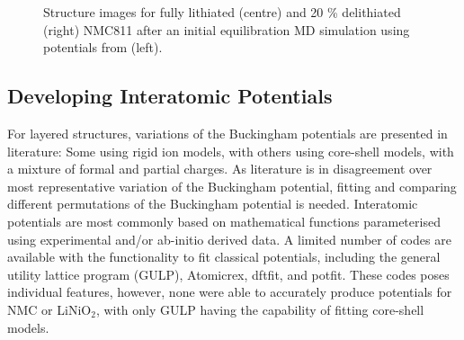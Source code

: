 \documentclass[journal=jacsat,manuscript=article]{achemso}
\begin{document}
\begin{figure}[h]
  \centering
    \caption{\label{fig:structure_collapse} Structure images for fully lithiated (centre) and 20 \% delithiated (right) NMC811 after an initial equilibration MD simulation using potentials from \citeauthor{Lee_and_Park_2012} (left). \cite{Lee_and_Park_2012} }
\end{figure}

\subsection{Developing Interatomic Potentials}
For layered structures, variations of the Buckingham potentials are presented in literature: Some using rigid ion models,\cite{Lewis_1985, Ledwaba2020, Sayle2005, Dawson2014} with others using core-shell models, \cite{Hart1998, Fisher2010, Lewis_1985,Ammundsen1999, Kerisit2014, He2019,lee2012atomistic} with a mixture of formal and partial charges. As literature is in disagreement over most representative variation of the Buckingham potential, fitting and comparing different permutations of the Buckingham potential is needed. Interatomic potentials are most commonly based on mathematical functions parameterised using experimental and/or ab-initio derived data. \cite{jones_1924, buckingham_classical_1938} A limited number of codes are available with the functionality to fit classical potentials, including the general utility lattice program (GULP), \cite{gale_gulp_1997} Atomicrex, \cite{Stukowski_2017} dftfit, \cite{dftfit} and potfit. \cite{wen_kim-compliant_2017} These codes poses individual features, however, none were able to accurately produce potentials for NMC or LiNiO$_2$, with only GULP having the capability of fitting core-shell models.
\end{document}
